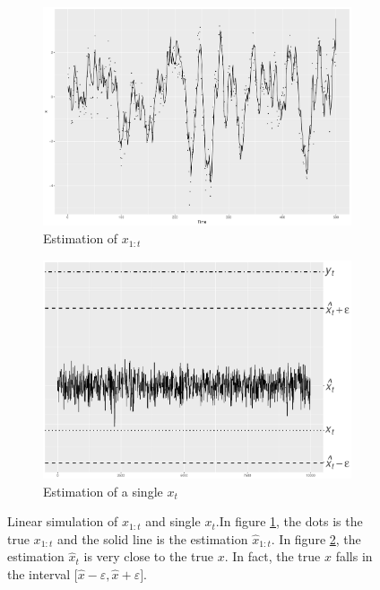 \begin{figure}[h]
\centering
\begin{subfigure}[b]{0.45\textwidth}
    \includegraphics[width=\textwidth]{Chapters/05MCMCOU/plots/linearsimuXall.pdf}
     \caption{Estimation of $x_{1:t}$}\label{MCMClinearsimuXall}
\end{subfigure}
\begin{subfigure}[b]{0.45\textwidth}
	\includegraphics[width=\textwidth]{Chapters/05MCMCOU/plots/gglinearestXt2.pdf}
     \caption{Estimation of a single $x_t$}\label{MCMClinearsimuXt2}
\end{subfigure}
\caption{Linear simulation of $x_{1:t}$ and single $x_t$.In figure \ref{MCMClinearsimuXall}, the dots is the true $x_{1:t}$ and the solid line is the estimation $\hat{x}_{1:t}$. In figure \ref{MCMClinearsimuXt2}, the estimation $\hat{x}_t$ is very close to the true $x$. In fact, the true $x$ falls in the interval $\lbrack \hat{x}-\varepsilon,\hat{x}+\varepsilon\rbrack$.}
\label{linearmarginXt}
\end{figure}



